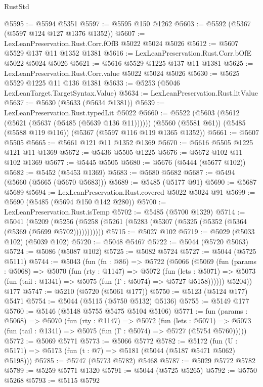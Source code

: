 \begin{lexlean}{RustStd}
\begin{coremodule}
@5595 := @5594 @5351
@5597 := @5595 @150 @1262
@5603 := @5592 (@5367 (@5597 @124 @127 @1376 @1352))
@5607 := LexLeanPreservation.Rust.Corr.fOfB @5022 @5024 @5026
@5612 := @5607 @5529 @137 @11 @1352 @1381
@5616 := LexLeanPreservation.Rust.Corr.bOfE @5022 @5024 @5026
@5621 := @5616 @5529 @1225 @137 @11 @1381
@5625 := LexLeanPreservation.Rust.Corr.value @5022 @5024 @5026
@5630 := @5625 @5529 @1225 @11 @136 @1381
@5633 := @5253 (@5046 LexLeanTarget.TargetSyntax.Value)
@5634 := LexLeanPreservation.Rust.litValue
@5637 := @5630 (@5633 (@5634 @1381))
@5639 := LexLeanPreservation.Rust.typedLit @5022
@5660 := @5522
    (@5603 (@5612 (@5621 (@5637 (@5485 (@5639 @136 @11))))))
    (@5560 (@5581 @61))
    (@5485 (@5588 @119 @116))
    (@5367 (@5597 @116 @119 @1365 @1352))
@5661 := @5607 @5505
@5665 := @5661 @121 @11 @1352 @1369
@5670 := @5616 @5505 @1225 @121 @11 @1369
@5672 := @5436 @5505 @1225
@5676 := @5672 @102 @11 @102 @1369
@5677 := @5445 @5505
@5680 := @5676 (@5444 (@5677 @102))
@5682 := @5452 (@5453 @1369)
@5683 := @5680 @5682
@5687 := @5494 (@5660 (@5665 (@5670 @5683)))
@5689 := @5485 (@5177 @91)
@5690 := @5687 @5689
@5694 := LexLeanPreservation.Rust.covered @5022 @5024 @91
@5699 := @5690 (@5485 (@5694 @150 @142 @280))
@5700 := LexLeanPreservation.Rust.isTemp
@5702 := @5485 (@5700 @1329)
@5714 := @5041
    (@5209 (@5256 (@5258 (@5261 (@5283 (@5307 (@5325 (@5352 (@5364 (@5369 (@5699 @5702)))))))))))
@5715 := @5027 @102
@5719 := @5029 (@5033 @102) (@5039 @102)
@5720 := @5048 @5467
@5722 := @5044 (@5720 @5063)
@5724 := @5086 (@5087 @102)
@5725 := @5082 @5724
@5727 := @5044 (@5725 @5111)
@5744 := @5043
    (fun (fn : @86) =>
    @5722
      (@5066
        (@5069
          (fun (params : @5068) =>
          @5070
            (fun (rty : @1147) =>
            @5072
              (fun (lets : @5071) =>
              @5073 (fun (tail : @1341) => @5075 (fun (Γ : @5074) => @5727 @5158))))))
        @5204))
    @177
@5747 := @5210 (@5720 (@5061 @177))
@5750 := @5123 (@5124 @177) @5471
@5754 := @5044 (@5115 (@5750 @5132) @5136)
@5755 := @5149 @177
@5760 := @5146 (@5148 @5755 @5475 @5104 @5106)
@5771 := fun (params : @5068) =>
  @5070
    (fun (rty : @1147) =>
    @5072
      (fun (lets : @5071) =>
      @5073 (fun (tail : @1341) => @5075 (fun (Γ : @5074) => @5727 (@5754 @5760)))))
@5772 := @5069 @5771
@5773 := @5066 @5772
@5782 := @5172 (fun (U : @5171) => @5173 (fun (t : @7) => @5181 (@5044 (@5187 @5471 @5062) @5198)))
@5785 := @5747 (@5773 @5782) @5468
@5787 := @5029 @5772 @5782
@5789 := @5259 @5771 @1320
@5791 := @5044 (@5725 @5265)
@5792 := @5750 @5268
@5793 := @5115 @5792

\end{coremodule}
\end{lexlean}
